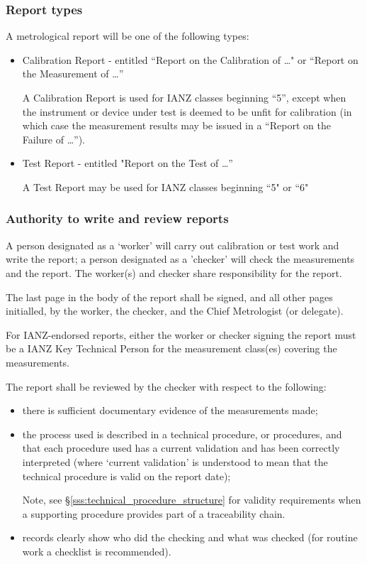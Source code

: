\subsubsection{Report types}
A metrological report will be one of the following types:
\begin{itemize}
\item Calibration Report - entitled ``Report on the Calibration of \ldots" or ``Report on the Measurement of \ldots'' 

A Calibration Report is used for IANZ classes beginning ``5'', except when the instrument or device under test is deemed to be unfit for calibration (in which case the measurement results may be issued in a ``Report on the Failure of \ldots'').

\item Test Report - entitled "Report on the Test of \ldots''  

A Test Report may be used for IANZ classes beginning ``5" or ``6"
\end{itemize} 

\subsubsection{Authority to write and review reports}
A person designated as a `worker' will carry out calibration or test work and write the report; a person designated as a 'checker' will check the measurements and the report. The worker(s) and checker share responsibility for the report.

The last page in the body of the report shall be signed, and all other pages initialled, by the worker, the checker, and the Chief Metrologist (or delegate). 

For IANZ-endorsed reports, either the worker or checker signing the report must be a IANZ Key Technical Person for the measurement class(es) covering the measurements.

The report shall be reviewed by the checker with respect to the following: 
\begin{itemize}
\item there is sufficient documentary evidence of the measurements made;
\item the process used is described in a technical procedure, or procedures, and that each procedure used has a current validation and has been correctly interpreted (where `current validation' is understood to mean that the technical procedure is valid on the report date);

Note, see \S\ref{sss:technical_procedure_structure} for validity requirements when a supporting procedure provides part of a traceability chain.

\item records clearly show who did the checking and what was checked (for routine work a checklist is recommended).
\end{itemize} 

